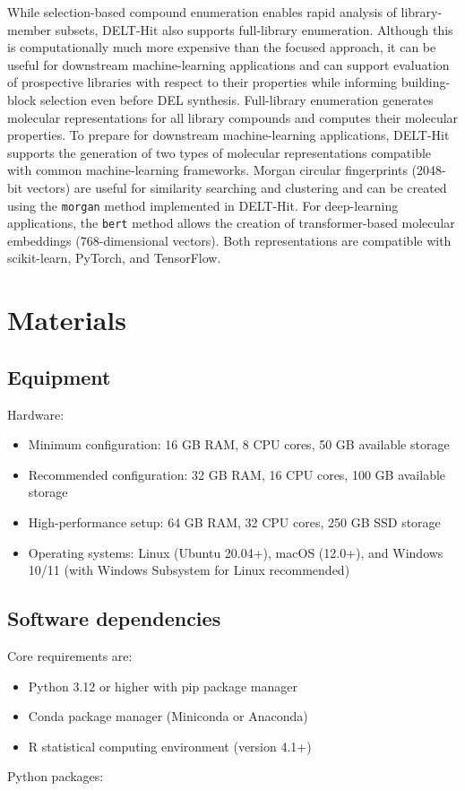 \documentclass[pdflatex,sn-nature]{sn-jnl}
\begin{document}
While selection-based compound enumeration enables rapid analysis of library-member subsets, DELT-Hit also supports full-library enumeration. Although this is computationally much more expensive than the focused approach, it can be useful for downstream machine-learning applications and can support evaluation of prospective libraries with respect to their properties while informing building-block selection even before DEL synthesis. Full-library enumeration generates molecular representations for all library compounds and computes their molecular properties. To prepare for downstream machine-learning applications, DELT-Hit supports the generation of two types of molecular representations compatible with common machine-learning frameworks. Morgan circular fingerprints (2048-bit vectors) are useful for similarity searching and clustering and can be created using the \texttt{morgan} method implemented in DELT-Hit. For deep-learning applications, the \texttt{bert} method allows the creation of transformer-based molecular embeddings (768-dimensional vectors). Both representations are compatible with scikit-learn, PyTorch, and TensorFlow.

\section{Materials}

\subsection{Equipment}
Hardware:

\begin{itemize}
  \item Minimum configuration: 16 GB RAM, 8 CPU cores, 50 GB available storage
  \item Recommended configuration: 32 GB RAM, 16 CPU cores, 100 GB available storage
  \item High-performance setup: 64 GB RAM, 32 CPU cores, 250 GB SSD storage
  \item Operating systems: Linux (Ubuntu 20.04+), macOS (12.0+), and Windows 10/11 (with Windows Subsystem for Linux recommended)
\end{itemize}

\subsection{Software dependencies}
Core requirements are:

\begin{itemize}
  \item Python 3.12 or higher with pip package manager
  \item Conda package manager (Miniconda or Anaconda)
  \item R statistical computing environment (version 4.1+)
\end{itemize}
Python packages:
\end{document}
